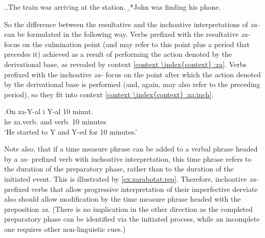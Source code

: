 \ex.\a.\label{ex:achiev:1}The train was arriving at the station.
\b.*John was finding his phone.\label{ex:achiev:2}

So the difference between the resultative  and the inchoative  interpretations of \textit{za-}   can be formulated in the following way. Verbs prefixed with the resultative  \textit{za-}   focus on the culmination point (and may refer to this point plus a period that precedes it) achieved as a result of performing the action denoted by the derivational base, as revealed by context   \ref{context \index{context} :za}. Verbs prefixed with the inchoative  \textit{za-}   focus on the point after which the action denoted by the derivational base is performed (and, again, may also refer to the preceding period), so they fit into context   \ref{context \index{context} :za:inch}.

\exg.\label{context \index{context} :za:inch}On za-Y-al i Y-al 10 minut.\\
he za.verb. and verb. 10 minutes\\
\trans `He started to Y and Y-ed for 10 minutes.'

Note also, that if a time measure phrase  can be added to a verbal phrase headed by a \textit{za-}  prefixed verb with inchoative  interpretation, this time phrase refers to the duration of the preparatory phase, rather than to the duration of the initiated event. This is illustrated by \ref{ex:zarabotat:rep}. Therefore, inchoative  \textit{za-}  prefixed verbs that allow progressive interpretation  of their imperfective derviate also should allow modification by the time measure phrase  headed with the preposition \textit{za}. (There is no implication in the other direction as the completed preparatory phase can be identified via the initiated process, while an incomplete one requires other non-linguistic cues.)

